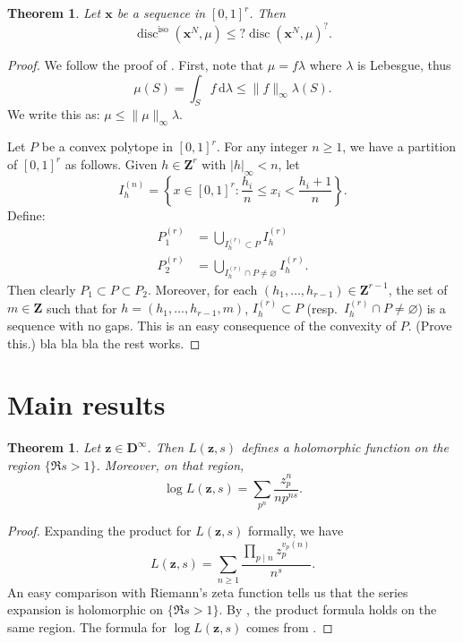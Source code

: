 \documentclass{article}
\DeclareMathOperator{\disc}{disc}
\newcommand{\bD}{\mathbf{D}}
\newcommand{\bx}{{\boldsymbol x}}
\newcommand{\bz}{{\boldsymbol z}}
\newcommand{\bZ}{\mathbf{Z}}
\newcommand{\dd}{\mathrm{d}}
\newcommand{\iso}{\mathrm{iso}}
\newtheorem{theorem}[subsection]{Theorem}
\theoremstyle{definition}
\begin{document}
\begin{theorem}
Let $\bx$ be a sequence in $[0,1]^r$. Then 
\[
	\disc^\iso(\bx^N,\mu) \leqslant ? \disc(\bx^N,\mu)^? .
\]
\end{theorem}
\begin{proof}
We follow the proof of \cite[Ch.2~Th.1.6]{kuipers-niederreiter-1974}. First, 
note that $\mu=f\lambda$ where $\lambda$ is Lebesgue, thus 
\[
	\mu(S) = \int_S f\, \dd\lambda \leqslant \|f\|_\infty \lambda(S) .
\]
We write this as: $\mu\leqslant \|\mu\|_\infty \lambda$. 

Let $P$ be a convex polytope in $[0,1]^r$. For any integer 
$n\geqslant 1$, we have a partition of $[0,1]^r$ as follows. Given 
$h\in \bZ^r$ with $|h|_\infty < n$, let 
\[
	I_h^{(n)} = \left\{ x\in [0,1]^r : \frac{h_i}{n} \leqslant x_i < \frac{h_i+1}{n}\right\} .
\]
Define:
\begin{align*}
	P_1^{(r)} &= \bigcup_{I_h^{(r)}\subset P} I_h^{(r)} \\
	P_2^{(r)} &= \bigcup_{I_h^{(r)}\cap P\ne \varnothing} I_h^{(r)} .
\end{align*}
Then clearly $P_1\subset P \subset P_2$. Moreover, for each 
$(h_1,\dots,h_{r-1})\in \bZ^{r-1}$, the set of $m\in \bZ$ such that 
for $h=(h_1,\dots,h_{r-1},m)$, 
$I_h^{(r)}\subset P$ (resp.~$I_h^{(r)}\cap P\ne \varnothing$) is a sequence 
with no gaps. This is an easy consequence of the convexity of $P$. (Prove 
this.) bla bla bla the rest works. 
\end{proof}





\section{Main results}\label{sec:prelim-result}

\begin{theorem}
Let $\bz\in \bD^\infty$. Then $L(\bz,s)$ defines a holomorphic 
function on the region $\{\Re s>1\}$. Moreover, on that region, 
\[
	\log L(\bz,s) = \sum_{p^n} \frac{z_p^n}{n p^{n s}} .
\]
\end{theorem}
\begin{proof}
Expanding the product for $L(\bz,s)$ formally, we have 
\[
	L(\bz,s) = \sum_{n\geqslant 1} \frac{\prod_{p\mid n} z_p^{v_p(n)}}{n^s} .
\]
An easy comparison with Riemann's zeta function tells us that the series 
expansion is holomorphic on $\{\Re s>1\}$. By \cite[Th.~11.7]{apostol-1976}, 
the product formula holds on the same region. The formula for 
$\log L(\bz,s)$ comes from \cite[11.9 Ex.2]{apostol-1976}.
\end{proof}
\end{document}
